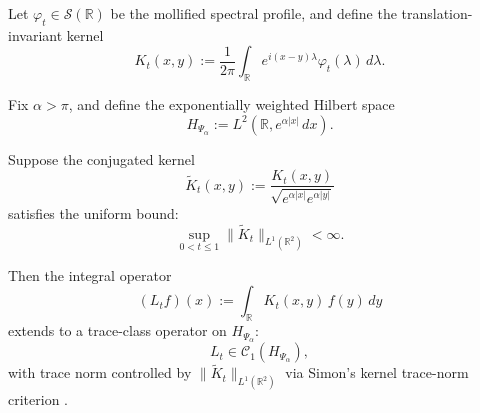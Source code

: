 \begin{lemma}
\label{lem:trace_class_Lt}
Let \( \varphi_t \in \mathcal{S}(\mathbb{R}) \) be the mollified spectral profile, and define the translation-invariant kernel
\[
K_t(x,y) := \frac{1}{2\pi} \int_{\mathbb{R}} e^{i(x - y)\lambda} \varphi_t(\lambda)\, d\lambda.
\]

Fix \( \alpha > \pi \), and define the exponentially weighted Hilbert space
\[
H_{\Psi_\alpha} := L^2(\mathbb{R}, e^{\alpha|x|}\, dx).
\]

Suppose the conjugated kernel
\[
\widetilde{K}_t(x,y) := \frac{K_t(x,y)}{\sqrt{e^{\alpha|x|} e^{\alpha|y|}}}
\]
satisfies the uniform bound:
\[
\sup_{0 < t \le 1} \| \widetilde{K}_t \|_{L^1(\mathbb{R}^2)} < \infty.
\]

Then the integral operator
\[
(L_t f)(x) := \int_{\mathbb{R}} K_t(x,y)\, f(y)\, dy
\]
extends to a trace-class operator on \( H_{\Psi_\alpha} \):
\[
L_t \in \mathcal{C}_1(H_{\Psi_\alpha}),
\]
with trace norm controlled by \( \| \widetilde{K}_t \|_{L^1(\mathbb{R}^2)} \) via Simon’s kernel trace-norm criterion \cite[Thm.~4.2]{Simon2005TraceIdeals}.
\end{lemma}
